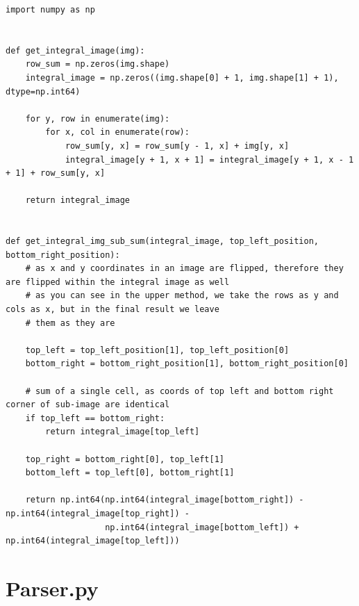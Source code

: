 \begin{lstlisting}[style=py]
import numpy as np


def get_integral_image(img):
    row_sum = np.zeros(img.shape)
    integral_image = np.zeros((img.shape[0] + 1, img.shape[1] + 1), dtype=np.int64)

    for y, row in enumerate(img):
        for x, col in enumerate(row):
            row_sum[y, x] = row_sum[y - 1, x] + img[y, x]
            integral_image[y + 1, x + 1] = integral_image[y + 1, x - 1 + 1] + row_sum[y, x]

    return integral_image


def get_integral_img_sub_sum(integral_image, top_left_position, bottom_right_position):
    # as x and y coordinates in an image are flipped, therefore they are flipped within the integral image as well
    # as you can see in the upper method, we take the rows as y and cols as x, but in the final result we leave
    # them as they are

    top_left = top_left_position[1], top_left_position[0]
    bottom_right = bottom_right_position[1], bottom_right_position[0]

    # sum of a single cell, as coords of top left and bottom right corner of sub-image are identical
    if top_left == bottom_right:
        return integral_image[top_left]

    top_right = bottom_right[0], top_left[1]
    bottom_left = top_left[0], bottom_right[1]

    return np.int64(np.int64(integral_image[bottom_right]) - np.int64(integral_image[top_right]) -
                    np.int64(integral_image[bottom_left]) + np.int64(integral_image[top_left]))

\end{lstlisting}

\section*{Parser.py}

